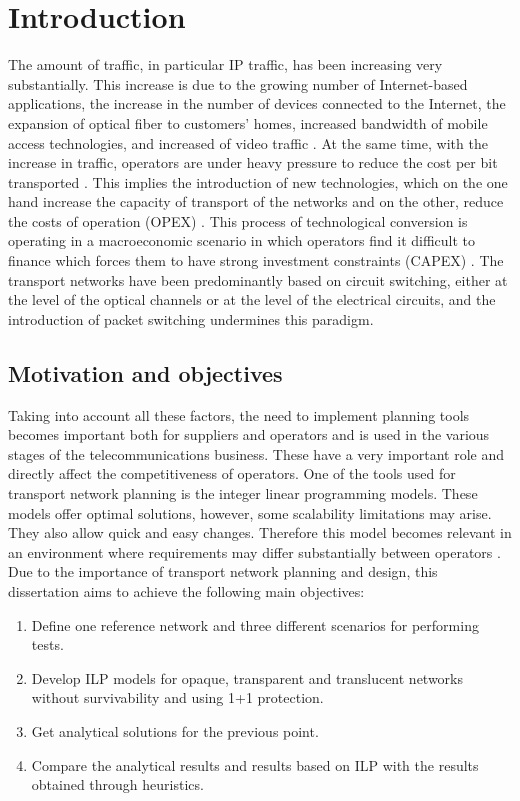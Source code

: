 \chapter{Introduction}
\label{introduction}

The amount of traffic, in particular IP traffic, has been increasing very substantially. This increase is due to the growing number of Internet-based applications, the increase in the number of devices connected to the Internet, the expansion of optical fiber to customers' homes, increased bandwidth of mobile access technologies, and increased of video traffic \cite{cisco}.
At the same time, with the increase in traffic, operators are under heavy pressure to reduce the cost per bit transported \cite{alcatel_lucent}. This implies the introduction of new technologies, which on the one hand increase the capacity of transport of the networks and on the other, reduce the costs of operation (OPEX) \cite{opexcapex}.
This process of technological conversion is operating in a macroeconomic scenario in which operators find it difficult to finance which forces them to have strong investment constraints (CAPEX) \cite{opexcapex}.
The transport networks have been predominantly based on circuit switching, either at the level of the optical channels or at the level of the electrical circuits, and the introduction of packet switching undermines this paradigm.


\newpage
\section{Motivation and objectives}
\label{objectives}
Taking into account all these factors, the need to implement planning tools becomes important both for suppliers and operators and is used in the various stages of the telecommunications business.
These have a very important role and directly affect the competitiveness of operators.
One of the tools used for transport network planning is the integer linear programming models.
These models offer optimal solutions, however, some scalability limitations may arise. They also allow quick and easy changes.
Therefore this model becomes relevant in an environment where requirements may differ substantially between operators \cite{teserui}.\\
Due to the importance of transport network planning and design, this dissertation aims to achieve the following main objectives:

\begin{enumerate}
  \item Define one reference network and three different scenarios for performing tests.
  \item Develop ILP models for opaque, transparent and translucent networks without survivability and using 1+1 protection.
  \item Get analytical solutions for the previous point.
  \item Compare the analytical results and results based on ILP with the results obtained through heuristics.
\end{enumerate}


